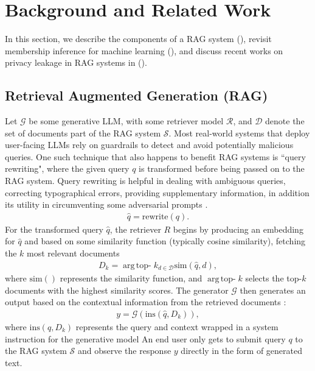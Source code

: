 \section{Background and Related Work}
\label{sec:setup}

In this section, we describe the components of a RAG system (), revisit membership inference for machine learning (), and
discuss recent works on privacy leakage in RAG systems in ().

\subsection{Retrieval Augmented Generation (RAG)}
\label{sec:RAG_description}

Let $\mathcal{G}$ be some generative LLM, with some retriever model $\mathcal{R}$, and $\mathcal{D}$ denote the set of documents part of the RAG system $\mathcal{S}$.
Most real-world systems that deploy user-facing LLMs rely on guardrails \citep{dong2024building} to detect and avoid potentially malicious queries. One such technique that also happens to benefit RAG systems \citep{ma-etal-2023-query, beck2025raising, mo-etal-2023-convgqr, lin2020conversational, wang2024maferw} is ``query rewriting", where the given query $q$ is transformed before being passed on to the RAG system. Query rewriting is helpful in dealing with ambiguous queries, correcting typographical errors, providing supplementary information, in addition its utility in circumventing some adversarial prompts \citep{jain2023baseline}.
\begin{align}
    \hat{q} = \text{rewrite}(q).
\end{align}
For the transformed query $\hat{q}$, the retriever $R$ begins by producing an embedding for $\hat{q}$ and based on some similarity function (typically cosine similarity), fetching the $k$ most relevant documents
\begin{align}
    D_k = \operatorname*{arg\,top-}k_{d \in \mathcal{D}} \text{sim}(\hat{q}, d),
\end{align}
where $\text{sim}()$ represents the similarity function, and \(\operatorname*{arg\,top-}k\) selects the top-$k$ documents with the highest similarity scores.
The generator $\mathcal{G}$ then generates an output based on the contextual information from the retrieved documents \citep{lewis2020retrieval}:
\begin{align}
    y = \mathcal{G}(\text{ins}(\hat{q}, D_k)),
\end{align}
where $\text{ins}(q, D_k)$ represents the query and context wrapped in a system instruction for the generative model An end user only gets to submit query $q$ to the RAG system $\mathcal{S}$ and observe the response $y$ directly in the form of generated text.

